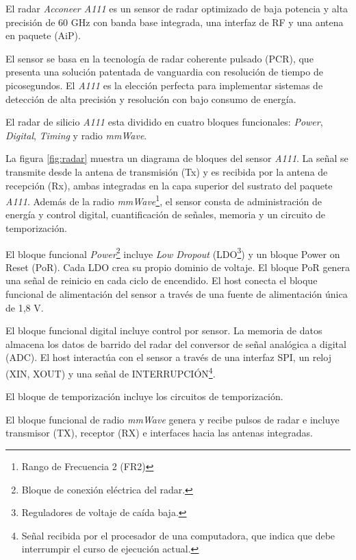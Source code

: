 El radar \textit{Acconeer A111} es un sensor de radar optimizado de baja potencia y alta precisión de 60 GHz con banda base integrada, una interfaz de RF y una antena en paquete (AiP).

El sensor se basa en la tecnología de radar coherente pulsado (PCR), que presenta una solución patentada de vanguardia con resolución de tiempo de picosegundos. El \textit{A111} es la elección perfecta para implementar sistemas de detección de alta precisión y resolución con bajo consumo de energía.

El radar de silicio \textit{A111} esta dividido en cuatro bloques funcionales: \textit{Power}, \textit{Digital}, \textit{Timing} y radio \textit{mmWave}.


La figura \ref{fig:radar} muestra un diagrama de bloques del sensor \textit{A111}. La señal se transmite desde la antena de transmisión (Tx) y es recibida por la antena de recepción (Rx), ambas integradas en la capa superior del sustrato del paquete \textit{A111}. Además de la radio \textit{mmWave}\footnote{Rango de Frecuencia 2 (FR2)}, el sensor consta de administración de energía y control digital, cuantificación de señales, memoria y un circuito de temporización.

El bloque funcional \textit{Power}\footnote{Bloque de conexión eléctrica del radar.} incluye \textit{Low Dropout} (LDO\footnote{Reguladores de voltaje de caída baja.}) y un bloque Power on Reset (PoR). Cada LDO crea su propio dominio de voltaje. El bloque PoR genera una señal de reinicio en cada ciclo de encendido. El host conecta el bloque funcional de alimentación del sensor a través de una fuente de alimentación única de 1,8 V.

El bloque funcional digital incluye control por sensor. La memoria de datos almacena los datos de barrido del radar del conversor de señal analógica a digital (ADC). El host interactúa con el sensor a través de una interfaz SPI, un reloj (XIN, XOUT) y una señal de INTERRUPCIÓN\footnote{Señal recibida por el procesador de una computadora, que indica que debe interrumpir el curso de ejecución actual. }.

El bloque de temporización incluye los circuitos de temporización.

El bloque funcional de radio \textit{mmWave} genera y recibe pulsos de radar e incluye transmisor (TX), receptor (RX) e interfaces hacia las antenas integradas.

